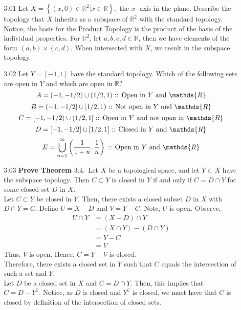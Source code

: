 \documentclass[12pt]{article}
\newcommand{\R}{\mathds{R}}
\begin{document}
\pagestyle{fancy}  
\lfoot{} \cfoot{} \rfoot{}

\begin{enumerate}

	\item[3.01] Let $X = \left\{ ( x , 0 ) \in \mathbb { R } ^ { 2 } | x \in \mathbb { R } \right\} ,$ the $x$ -axis in the plane. Describe the topology that $X$ inherits as a subspace of $\mathbb { R } ^ { 2 }$ with the standard topology.\\
	Notice, the basis for the Product Topology is the product of the basis of the individual properties. For $ \R^2 $, let $ a,b,c,d\in\R $, then we have elements of the form $ (a,b)\times(c,d) $. When intersected with $ X $, we result in the subspace topology.

	\item[3.02] Let $Y = [ - 1,1 ]$ have the standard topology. Which of the following sets are open in $Y$ and which are open in $\mathbb { R } ?$\\
		\[A = ( - 1 , - 1 / 2 ) \cup ( 1 / 2,1 ) \text{ ::  Open in $ Y $ and $ \R $}\]
		\[B = ( - 1 , - 1 / 2 ] \cup [ 1 / 2,1 ) \text{ ::  Not open in $ Y $ and $ \R $}\]
		\[C = [ - 1 , - 1 / 2 ) \cup ( 1 / 2,1 ] \text{ ::  Open in $ Y $ and not open in $ \R $}\]
		\[D = [ - 1 , - 1 / 2 ] \cup [ 1 / 2,1 ] \text{ ::  Closed in $ Y $ and $ \R $}\]
		\[E = \bigcup _ { n = 1 } ^ { \infty } \left( \frac { 1 } { 1 + n } , \frac { 1 } { n } \right) \text{ ::  Open in $ Y $ and $ \R $}\]

	\item[3.03] \textbf{Prove Theorem $3.4 :$ }Let $X$ be a topological space, and let $Y \subset X$ have the subspace topology. Then $C \subset Y$ is closed in $Y$ if and only if $C = D \cap Y$ for some closed set $D$ in $X$.\\
	Let $ C\subset Y $ be closed in $ Y $. Then, there exists a closed subset $ D $ in $ X $ with $ D\cap Y = C $. Define $ U = X-D $ and $ V=Y-C $. Note, $ U $ is open. Observe,
		\begin{align*}	
			U\cap Y &= (X-D)\cap Y\\
					&= (X\cap Y)-(D\cap Y)\\
					&= Y-C\\
					&= V
		\end{align*}
	Thus, $ V $ is open. Hence, $ C=Y-V $ is closed.\\
	Therefore, there exists a closed set in $ Y $ such that $ C $ equals the intersection of such a set and $ Y $.
	\\
	Let $ D $ be a closed set in $ X $ and $ C= D\cap Y $. Then, this implies that $ C=D-Y^\complement $. Notice, as $ D $ is closed and $ Y^\complement $ is closed, we must have that $ C $ is closed by definition of the intersection of closed sets.


\end{enumerate}
\end{document}
